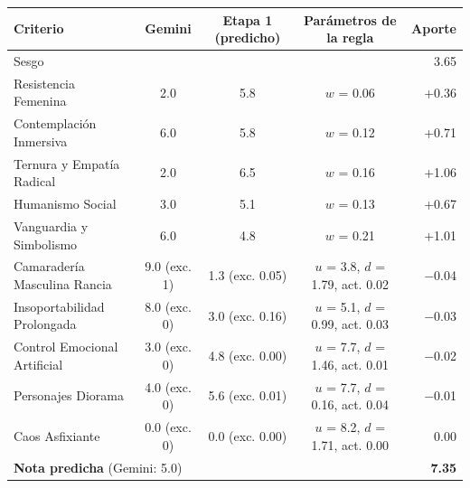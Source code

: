 \begin{tabular}{lcccr}
\toprule
Criterio & Gemini & Etapa 1 (predicho) & Parámetros de la regla & Aporte \\
\midrule
Sesgo & & & & 3.65 \\
Resistencia Femenina & 2.0 & 5.8 & $w$ = 0.06 & +0.36 \\
Contemplación Inmersiva & 6.0 & 5.8 & $w$ = 0.12 & +0.71 \\
Ternura y Empatía Radical & 2.0 & 6.5 & $w$ = 0.16 & +1.06 \\
Humanismo Social & 3.0 & 5.1 & $w$ = 0.13 & +0.67 \\
Vanguardia y Simbolismo & 6.0 & 4.8 & $w$ = 0.21 & +1.01 \\
\midrule
Camaradería Masculina Rancia & 9.0 (exc. 1) & 1.3 (exc. 0.05) & $u$ = 3.8, $d$ = 1.79, act. 0.02 & $-$0.04 \\
Insoportabilidad Prolongada & 8.0 (exc. 0) & 3.0 (exc. 0.16) & $u$ = 5.1, $d$ = 0.99, act. 0.03 & $-$0.03 \\
Control Emocional Artificial & 3.0 (exc. 0) & 4.8 (exc. 0.00) & $u$ = 7.7, $d$ = 1.46, act. 0.01 & $-$0.02 \\
Personajes Diorama & 4.0 (exc. 0) & 5.6 (exc. 0.01) & $u$ = 7.7, $d$ = 0.16, act. 0.04 & $-$0.01 \\
Caos Asfixiante & 0.0 (exc. 0) & 0.0 (exc. 0.00) & $u$ = 8.2, $d$ = 1.71, act. 0.00 & 0.00 \\
\midrule
\multicolumn{4}{l}{\textbf{Nota predicha} (Gemini: 5.0)} & \textbf{7.35} \\
\bottomrule
\end{tabular}
